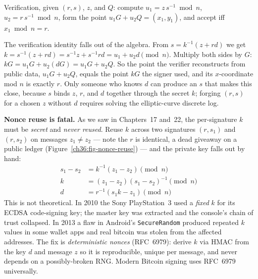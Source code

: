 Verification, given $(r,s)$, $z$, and $Q$: compute $u_1 = z\,s^{-1}\bmod n$, $u_2 = r\,s^{-1}\bmod n$, form the point $u_1 G + u_2 Q = (x_1,y_1)$, and accept iff $x_1 \bmod n = r$.

\begin{whybox}
The verification identity falls out of the algebra. From $s = k^{-1}(z+rd)$ we get $k = s^{-1}(z+rd) = s^{-1}z + s^{-1}rd = u_1 + u_2 d \pmod n$. Multiply both sides by $G$: $kG = u_1 G + u_2 (dG) = u_1 G + u_2 Q$. So the point the verifier reconstructs from public data, $u_1 G + u_2 Q$, equals the point $kG$ the signer used, and its $x$-coordinate mod $n$ is exactly $r$. Only someone who knows $d$ can produce an $s$ that makes this close, because $s$ binds $z$, $r$, and $d$ together through the secret $k$; forging $(r,s)$ for a chosen $z$ without $d$ requires solving the elliptic-curve discrete log.
\end{whybox}

\begin{attackbox}
\textbf{Nonce reuse is fatal.} As we saw in Chapters~17 and~22, the per-signature $k$ must be \emph{secret} and \emph{never reused}. Reuse $k$ across two signatures $(r,s_1)$ and $(r,s_2)$ on messages $z_1\ne z_2$ --- note the $r$ is identical, a dead giveaway on a public ledger (Figure~\ref{ch36:fig-nonce-reuse}) --- and the private key falls out by hand:
\begin{align*}
  s_1 - s_2 &= k^{-1}(z_1 - z_2) \pmod n \\[4pt]
  k &= (z_1 - z_2)(s_1 - s_2)^{-1} \pmod n \\[4pt]
  d &= r^{-1}(s_1 k - z_1) \pmod n
\end{align*}
This is not theoretical. In 2010 the Sony PlayStation~3 used a \emph{fixed} $k$ for its ECDSA code-signing key; the master key was extracted and the console's chain of trust collapsed. In 2013 a flaw in Android's \texttt{SecureRandom} produced repeated $k$ values in some wallet apps and real bitcoin was stolen from the affected addresses. The fix is \emph{deterministic nonces} (RFC~6979): derive $k$ via HMAC from the key $d$ and message $z$ so it is reproducible, unique per message, and never depends on a possibly-broken RNG. Modern Bitcoin signing uses RFC~6979 universally.
\end{attackbox}

